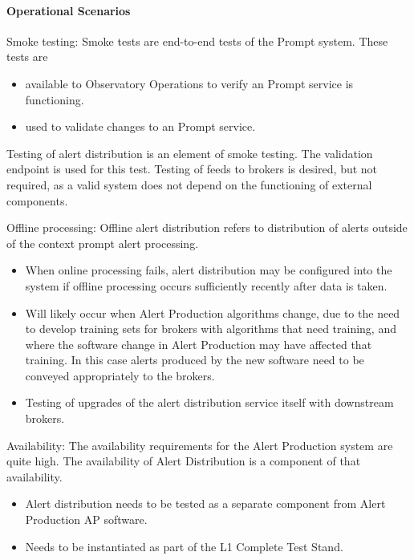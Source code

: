 \paragraph{Operational Scenarios}

Smoke testing:  Smoke tests are end-to-end tests of the Prompt system. These tests are

\begin{itemize}

\item available to Observatory Operations to verify an Prompt service is functioning.

\item used to validate changes to an Prompt service.

\end{itemize}

Testing of alert distribution is an element of smoke testing. The validation endpoint is used for this test. Testing of feeds to brokers is desired, but not required, as a valid system does not depend on the functioning of external components.

Offline processing:  Offline alert distribution refers to distribution of alerts outside of the context prompt alert processing.

\begin{itemize}

\item When online processing fails, alert distribution may be configured into the system if offline processing occurs sufficiently recently after data is taken.

\item Will likely occur when Alert Production algorithms change, due to the need to develop training sets for brokers with algorithms that need training, and where the software change in Alert Production may have affected that training. In this case alerts produced by the new software need to be conveyed appropriately to the brokers.

\item Testing of upgrades of the alert distribution service itself with downstream brokers.

\end{itemize}

Availability: The availability requirements for the Alert Production system are quite high. The availability of Alert Distribution is a component of that availability.

\begin{itemize}

\item Alert distribution needs to be tested as a separate component from Alert Production AP software.

\item Needs to be instantiated as part of the L1 Complete Test Stand.

\end{itemize}

